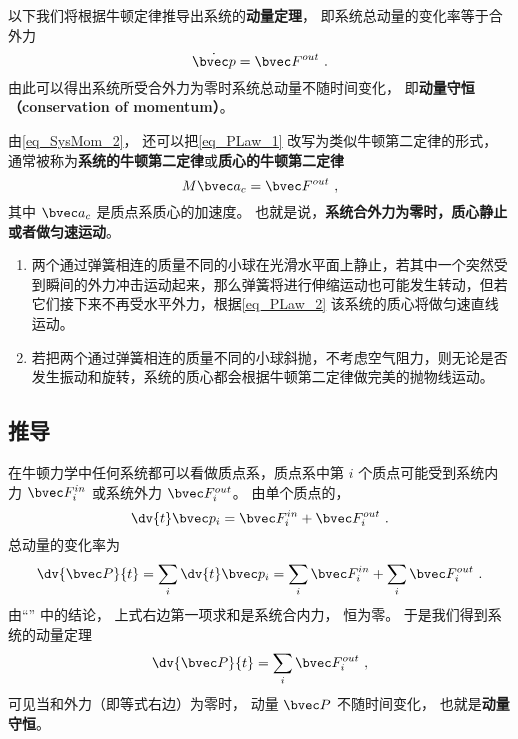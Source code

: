 
以下我们将根据牛顿定律推导出系统的\textbf{动量定理}， 即系统总动量的变化率等于合外力
\begin{equation}\label{eq_PLaw_1}
\dot {\bvec p} = \bvec F^{out}~.
\end{equation}
由此可以得出系统所受合外力为零时系统总动量不随时间变化， 即\textbf{动量守恒（conservation of momentum）}。

由\autoref{eq_SysMom_2}， 还可以把\autoref{eq_PLaw_1} 改写为类似牛顿第二定律的形式， 通常被称为\textbf{系统的牛顿第二定律}或\textbf{质心的牛顿第二定律}
\begin{equation}\label{eq_PLaw_2}
M \bvec a_c = \bvec F^{out}~,
\end{equation}
其中 $\bvec a_c$ 是质点系质心的加速度。 也就是说，\textbf{系统合外力为零时，质心静止或者做匀速运动}。

\begin{example}{}
\begin{enumerate}
\item 两个通过弹簧相连的质量不同的小球在光滑水平面上静止，若其中一个突然受到瞬间的外力冲击运动起来，那么弹簧将进行伸缩运动也可能发生转动，但若它们接下来不再受水平外力，根据\autoref{eq_PLaw_2} 该系统的质心将做匀速直线运动。
\item 若把两个通过弹簧相连的质量不同的小球斜抛，不考虑空气阻力，则无论是否发生振动和旋转，系统的质心都会根据牛顿第二定律做完美的抛物线运动。
\end{enumerate}
\end{example}

\subsection{推导}
在牛顿力学中任何系统都可以看做质点系，质点系中第 $i$ 个质点可能受到系统内力 $\bvec F_i^{in}$ 或系统外力 $\bvec F_i^{out}$。 由单个质点的，
\begin{equation}
\dv{t} \bvec p_i = \bvec F_i^{in} + \bvec F_i^{out}~.
\end{equation}
总动量的变化率为
\begin{equation}
\dv{\bvec P}{t} = \sum_i \dv{t} \bvec p_i  = \sum_i \bvec F_i^{in}  + \sum_i \bvec F_i^{out}~.
\end{equation}
由“” 中的结论， 上式右边第一项求和是系统合内力， 恒为零。 于是我们得到系统的动量定理
\begin{equation}
\dv{\bvec P}{t} = \sum_i \bvec F_i^{out}~,
\end{equation}
可见当和外力（即等式右边）为零时， 动量 $\bvec P$ 不随时间变化， 也就是\textbf{动量守恒}。

